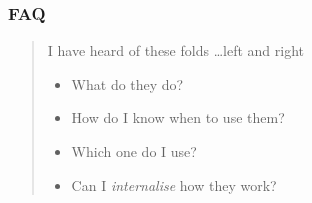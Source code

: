 \begin{frame}
\frametitle{FAQ}
\begin{quote}
I have heard of these folds \ldots left and right
\begin{itemize}
\item What do they do?
\item How do I know when to use them?
\item Which one do I use?
\item Can I \emph{internalise} how they work?
\end{itemize}
\end{quote}
\end{frame}
